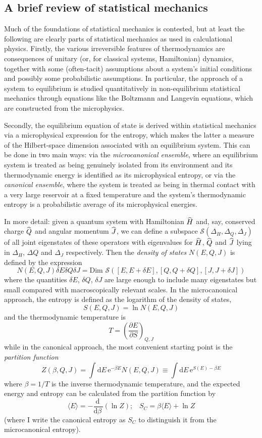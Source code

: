 \documentclass{article}
\newcommand{\dr}[1]{\ensuremath{\mathrm{d} #1\,}}
\newcommand{\mc}[1]{\ensuremath{\mathcal{#1}}}
\newcommand{\dbd}[2]{\ensuremath{\frac{\dr{#1}}{\dr{#2}}}}
\newcommand{\pbp}[2]{\ensuremath{\frac{\partial #1}{\partial #2}}}
\newcommand{\op}[1]{\ensuremath{\widehat{\textsf{\ensuremath{#1}}}}}
\newcommand{\be}{\begin{equation}}
\newcommand{\ee}{\end{equation}}
\newcommand{\e}[1]{\mathrm{e}^{#1}}
\begin{document}
\subsection{A brief review of statistical mechanics}



Much of the foundations of statistical mechanics is contested, but at least the following are clearly parts of statistical mechanics as used in calculational physics. Firstly, the various irreversible features of thermodynamics are consequences of unitary (or, for classical systems, Hamiltonian) dynamics, together with some (often-tacit) assumptions about a system's initial conditions and possibly some probabilistic assumptions. In particular, the approach of a system to equilibrium is studied quantitatively in non-equilibrium statistical mechanics through equations like the Boltzmann and Langevin equations, which are constructed from the microphysics.

Secondly, the equilibrium equation of state is derived within statistical mechanics via a microphysical expression for the entropy, which makes the latter a measure of the Hilbert-space dimension associated with an equilibrium system. This can be done in two main ways: via the \emph{microcanonical ensemble}, where an equilibrium system is treated as being genuinely isolated from its environment and its thermodynamic energy is identified as its microphysical entropy, or via the \emph{canonical ensemble}, where the system is treated as being in thermal contact with a very large reservoir at a fixed temperature and the system's thermodynamic entropy is a probabilistic average of its microphysical energies. 

In more detail: given a quantum system with Hamiltonian \op{H} and, say, conserved charge $\op{Q}$ and angular momentum $\op{J}$, we can define a subspace $\mc{S}(\Delta_H,\Delta_Q,\Delta_J)$ of all joint eigenstates of these operators with eigenvalues for  $\op{H}$, $\op{Q}$ and $\op{J}$ lying in $\Delta_H$, $\Delta Q$ and $\Delta_J$ respectively. Then the \emph{density of states} $N(E,Q,J)$ is defined by the expression
\be
N(E,Q,J)\delta E \delta Q\delta J = \mathrm{Dim} \,\,\mc{S}([E,E+\delta E],[Q,Q+\delta Q],[J,J+\delta J])
\ee
where the quantities $\delta E$, $\delta Q$, $\delta J$ are large enough to include many eigenstates but small compared with macroscopically relevant scales. In the microcanonical approach, the entropy is defined as the logarithm of the density of states, 
\be
S(E,Q,J)= \ln N(E,Q,J)
\ee
and the thermodynamic temperature is 
\be
T = \left(\pbp{E}{S}\right)_{Q,J}
\ee
while in the canonical approach, the  most convenient starting point is the \emph{partition function}
 \be \label{partitionfunction}
Z (\beta,Q,J) = \int \dr{E}\e{-\beta E} N(E,Q,J) \equiv \int \dr{E} \e{S(E)-\beta E}
 \ee
 where $\beta=1/T$ is the inverse thermodynamic temperature, and the expected energy and entropy can be calculated from the partition function by
 \be
 \langle E \rangle = -\dbd{}{\beta}(\ln Z);\,\,\,\,\, S_C = \beta \langle E \rangle + \ln Z
 \ee 
 (where I write the canonical entropy as $S_C$ to distinguish it from the microcanonical entropy).
\end{document}
